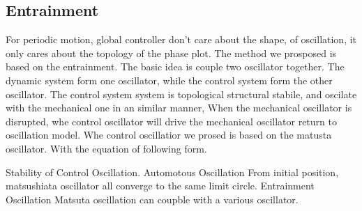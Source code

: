 \subsection{Entrainment}
For periodic motion, global controller don’t care about the shape, of oscillation, it only cares about the topology of the phase plot.
The method we prosposed is based on the entrainment.
The basic idea is couple two oscillator together. The dynamic system form one oscillator, while the control system form the other oscillator.
The control system system is topological structural stabile, and oscilate with the mechanical one in an similar manner,
When the mechanical oscillator is disrupted, whe control oscillator will drive the mechanical oscillator return to oscillation model.
Whe control oscillatior we prosed is based on the matusta oscillator.
With the equation of following form.


Stability of Control Oscillation.
Automotous Oscillation
From initial position, matsushiata oscillator all converge to the same limit circle.
Entrainment Oscillation
Matsuta oscillation can coupble with a various oscillator.